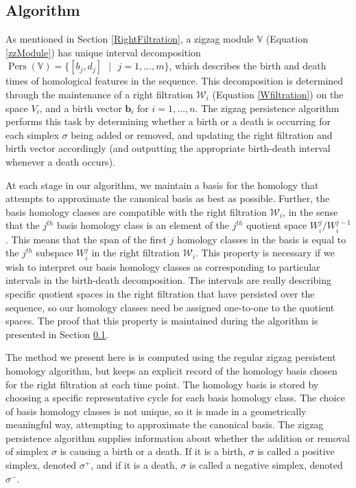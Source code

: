\documentclass[12pt]{article}
\DeclareMathOperator{\Pers}{Pers}
\begin{document}
\subsection{Algorithm}\label{Algorithm}

As mentioned in Section \ref{RightFiltration}, a zigzag module $\mathbb{V}$ (Equation \ref{zzModule}) has unique interval decomposition $\Pers(\mathbb{V}) = \{[b_j,d_j] \mbox{ } | \mbox{ } j=1,\ldots,m \}$, which describes the birth and death times of homological features in the sequence. This decomposition is determined through the maintenance of a right filtration $\mathcal{W}_i$ (Equation \ref{Wfiltration}) on the space $V_i$, and a birth vector $\mathbf{b}_i$ for $i = 1,\ldots,n$. The zigzag persistence algorithm performs this task by determining whether a birth or a death is occurring for each simplex $\sigma$ being added or removed, and updating the right filtration and birth vector accordingly (and outputting the appropriate birth-death interval whenever a death occurs).

At each stage in our algorithm, we maintain a basis for the homology that attempts to approximate the canonical basis as best as possible. Further, the basis homology classes are compatible with the right filtration $\mathcal{W}_i$, in the sense that the $j^{th}$  basis homology class is an element of the $j^{th}$ quotient space $W_i^j/W_i^{j-1}$. This means that the span of the first $j$ homology classes in the basis is equal to the $j^{th}$ subspace $W_i^j$ in the right filtration $\mathcal{W}_i$. This property is necessary if we wish to interpret our basis homology classes as corresponding to particular intervals in the birth-death decomposition. The intervals are really describing specific quotient spaces in the right filtration that have persisted over the sequence, so our homology classes need be assigned one-to-one to the quotient spaces. The proof that this property is maintained during the algorithm is presented in Section \ref{Algorithm}.

The method we present here is is computed using the regular zigzag persistent homology algorithm, but keeps an explicit record of the homology basis chosen for the right filtration at each time point. The homology basis is stored by choosing a specific representative cycle for each basis homology class. The choice of basis homology classes is not unique, so it is made in a geometrically meaningful way, attempting to approximate the canonical basis. The zigzag persistence algorithm supplies information about whether the addition or removal of simplex $\sigma$ is causing a birth or a death. If it is a birth, $\sigma$ is called a positive simplex, denoted $\sigma^+$, and if it is a death, $\sigma$ is called a negative simplex, denoted $\sigma^-$.
\end{document}
